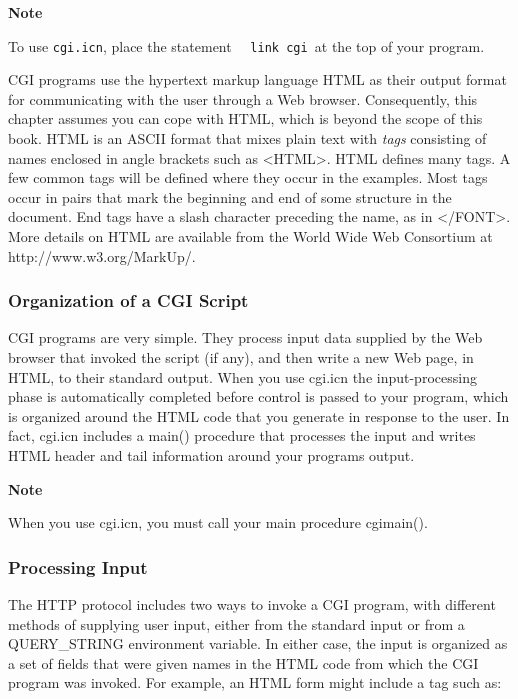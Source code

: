 {\sffamily\bfseries
Note}

{\sffamily
To use \texttt{cgi.icn}, place the statement\newline
 \ \ \texttt{link cgi\newline
}at the top of your program.}

CGI programs use the hypertext markup language HTML as their output
format for communicating with the user through a Web browser.
Consequently, this chapter assumes you can cope with HTML, which is
beyond the scope of this book. HTML is an ASCII format that mixes plain
text with \textit{tags} consisting of names enclosed in angle brackets
such as \textsf{{\textless}HTML{\textgreater}}. HTML defines many tags.
A few common tags will be defined where they occur in the examples.
Most tags occur in pairs that mark the beginning and end of some
structure in the document. End tags have a slash character preceding
the name, as in \textsf{{\textless}/FONT{\textgreater}}. More details
on HTML are available from the World Wide Web Consortium at
\textsf{http://www.w3.org/MarkUp/}.

\subsubsection[Organization of a CGI Script]{Organization of a CGI
Script}
CGI programs are very simple. They process input data supplied by the
Web browser that invoked the script (if any), and then write a new Web
page, in HTML, to their standard output. When you use \textsf{cgi.icn}
the input-processing phase is automatically completed before control is
passed to your program, which is organized around the HTML code that
you generate in response to the user. In fact, cgi.icn includes a
\textsf{main()} procedure that processes the input and writes HTML
header and tail information around your program{\textquotesingle}s
output. 

{\sffamily\bfseries
Note}

{\sffamily
When you use cgi.icn, you must call your main procedure cgimain(). }

\subsubsection{Processing Input }
The HTTP protocol includes two ways to invoke a CGI program,
with different methods of supplying user input, either from the
standard input or from a \textsf{QUERY\_STRING} environment variable.
In either case, the input is organized as a set of fields that were
given names in the HTML code from which the CGI program was invoked.
For example, an HTML form might include a tag such as: 

